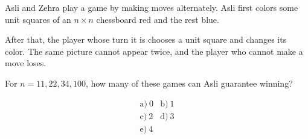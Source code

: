 Asli and Zehra play a game by making moves alternately. Asli first colors some unit squares of an \(n\times n\) chessboard red and the rest blue.



After that, the player whose turn it is chooses a unit square and changes its color. The same picture cannot appear twice, and the player who cannot make a move loses.



For \(n=11,22,34,100\), how many of these games can Asli guarantee winning?



\[
\begin{array}{ll}
\text{a)}\ 0 & \text{b)}\ 1 \\
\text{c)}\ 2 & \text{d)}\ 3 \\
\text{e)}\ 4
\end{array}
\]
